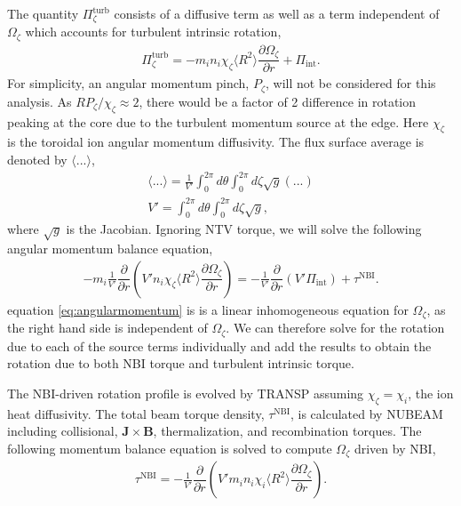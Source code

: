\documentclass[aip, pop, preprint]{revtex4-1}
\newcommand{\partder}[2]{\dfrac{\partial  #1}{\partial  #2}} %
\begin{document}
The quantity $\Pi_{\zeta}^{\mathrm{turb}}$ consists of a diffusive term as well as a term independent of $\Omega_{\zeta}$ which accounts for turbulent intrinsic rotation, 
\begin{gather}
\Pi_{\zeta}^{\mathrm{turb}} = -m_i n_i \chi_{\zeta} \langle R^2 \rangle \partder{\Omega_{\zeta}}{r} + \Pi_{\mathrm{int}}.
\end{gather}
For simplicity, an angular momentum pinch, $P_{\zeta}$, will not be considered for this analysis. As $R P_{\zeta}/\chi_{\zeta} \approx 2$, there would be a factor of 2 difference in rotation peaking at the core due to the turbulent momentum source at the edge.\cite{LeeThesis} Here $\chi_{\zeta}$ is the toroidal ion angular momentum diffusivity. The flux surface average is denoted by $\langle ... \rangle$,
\begin{gather}
\langle ... \rangle = \frac{1}{V'} \int_0^{2 \pi} d \theta \int_0^{2 \pi} d \zeta \sqrt{g} (...)
\\ V' = \int_0^{2\pi} d \theta \int_0^{2 \pi} d \zeta \sqrt{g},
\end{gather}
where $\sqrt{g}$ is the Jacobian.
Ignoring NTV torque, we will solve the following angular momentum balance equation,
\begin{gather}
-m_i \frac{1}{V'} \partder{}{r} \left( V' n_i \chi_{\zeta} \langle R^2 \rangle \partder{\Omega_{\zeta}}{r} \right) =  -\frac{1}{V'} \partder{}{r} \left( V' \Pi_{\mathrm{int}} \right) + \tau^{\mathrm{NBI}}.
\label{eq:angularmomentum}
\end{gather}
equation \ref{eq:angularmomentum} is is a linear inhomogeneous equation for $\Omega_{\zeta}$, as the right hand side is independent of $\Omega_{\zeta}$. We can therefore solve for the rotation due to each of the source terms individually and add the results to obtain the rotation due to both NBI torque and turbulent intrinsic torque. 

The NBI-driven rotation profile is evolved by TRANSP assuming $\chi_{\zeta} = \chi_{i}$, the ion heat diffusivity. The total beam torque density, $\tau^{\mathrm{NBI}}$, is calculated by NUBEAM including collisional, $\bm{J} \times \bm{B}$, thermalization, and recombination torques. The following momentum balance equation is solved to compute $\Omega_{\zeta}$ driven by NBI,
\begin{gather}
\tau^{\mathrm{NBI}} = -\frac{1}{V'} \partder{}{r} \left( V' m_i n_i \chi_{i} \langle R^2 \rangle \partder{\Omega_{\zeta}}{r} \right).
\end{gather} 
\end{document}
